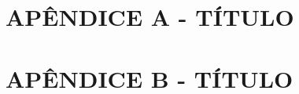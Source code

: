 \begin{apendicesenv}
	\partapendices
	\chapter*{APÊNDICE A - TÍTULO}
	\lipsum[5]
	\chapter*{APÊNDICE B - TÍTULO}
	\lipsum[5]
\end{apendicesenv}
